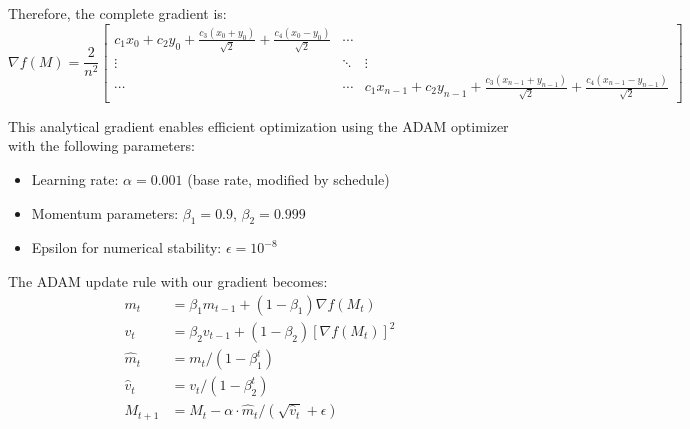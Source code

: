 Therefore, the complete gradient is:
\begin{equation}
\nabla f(M) = \frac{2}{n^2}\begin{bmatrix}
c_1 x_0 + c_2 y_0 + \frac{c_3(x_0+y_0)}{\sqrt{2}} + \frac{c_4(x_0-y_0)}{\sqrt{2}} & \cdots \\
\vdots & \ddots & \vdots \\
\cdots & \cdots & c_1 x_{n-1} + c_2 y_{n-1} + \frac{c_3(x_{n-1}+y_{n-1})}{\sqrt{2}} + \frac{c_4(x_{n-1}-y_{n-1})}{\sqrt{2}}
\end{bmatrix}
\end{equation}

This analytical gradient enables efficient optimization using the ADAM optimizer with the following parameters:
\begin{itemize}
    \item Learning rate: $\alpha = 0.001$ (base rate, modified by schedule)
    \item Momentum parameters: $\beta_1 = 0.9$, $\beta_2 = 0.999$
    \item Epsilon for numerical stability: $\epsilon = 10^{-8}$
\end{itemize}

The ADAM update rule with our gradient becomes:
\begin{align}
m_t &= \beta_1 m_{t-1} + (1-\beta_1) \nabla f(M_t) \\
v_t &= \beta_2 v_{t-1} + (1-\beta_2) [\nabla f(M_t)]^2 \\
\hat{m}_t &= m_t / (1 - \beta_1^t) \\
\hat{v}_t &= v_t / (1 - \beta_2^t) \\
M_{t+1} &= M_t - \alpha \cdot \hat{m}_t / (\sqrt{\hat{v}_t} + \epsilon)
\end{align}

